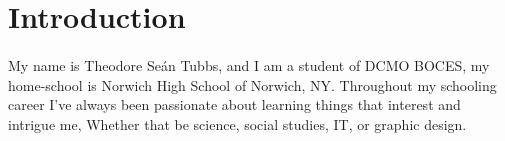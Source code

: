 \section{Introduction}
\paragraph{}
My name is Theodore Se\'{a}n Tubbs, and I am a student of DCMO BOCES, my
home-school is Norwich High School of Norwich, NY. Throughout my schooling
career I've always been passionate about learning things that interest and
intrigue me, Whether that be science, social studies, IT, or graphic design.
